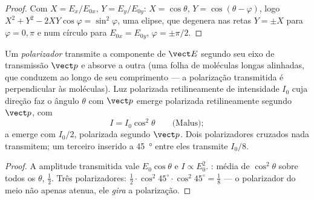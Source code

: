\begin{proof}
Com $X = E_x/E_{0x}$, $Y = E_y/E_{0y}$: $X = \cos\theta$, $Y = \cos(\theta - \varphi)$, logo
$X^2 + Y^2 - 2XY\cos\varphi = \sin^2\varphi$, uma elipse, que degenera nas
retas $Y = \pm X$ para $\varphi = 0, \pi$ e num círculo para $E_{0x} = E_{0y}$,
$\varphi = \pm\pi/2$.
\end{proof}

\begin{proposition}\label{prop:b2:plane-waves-polarization:malus}
Um \emph{polarizador} transmite a componente de $\vect E$ segundo seu
eixo de transmissão $\vect p$ e absorve a outra (uma folha de moléculas
longas alinhadas, que conduzem ao longo de seu comprimento --- a polarização
transmitida é perpendicular às moléculas). Luz polarizada retilineamente
de intensidade $I_0$ cuja direção faz o ângulo $\theta$ com
$\vect p$ emerge polarizada retilineamente segundo $\vect p$, com
\[
I = I_0\cos^2\theta \qquad\text{(Malus)} ;
\]
a  emerge com $I_0/2$, polarizada segundo $\vect p$. Dois
polarizadores cruzados nada transmitem; um terceiro inserido a
\qty{45}{\degree} entre eles transmite $I_0/8$.
\end{proposition}

\begin{proof}
A amplitude transmitida vale $E_0\cos\theta$ e $I \propto E_0^2$. : média de $\cos^2\theta$ sobre todos os $\theta$, $\tfrac12$. Três polarizadores:
$\tfrac12\cdot\cos^2 45^\circ\cdot\cos^2 45^\circ = \tfrac18$ --- o polarizador
do meio não apenas atenua, ele \emph{gira} a polarização.
\end{proof}


